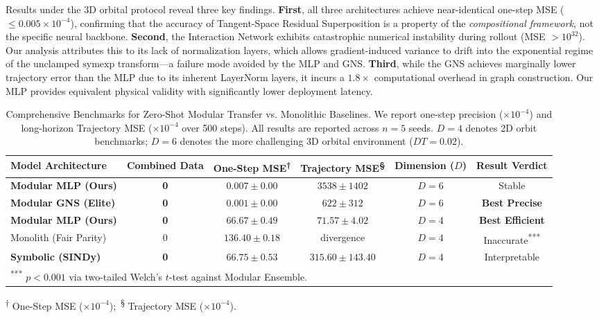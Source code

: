 \documentclass[twoside,11pt]{article}
\begin{document}
Results under the 3D orbital protocol reveal three key findings. \textbf{First}, all three architectures achieve near-identical one-step MSE ($\leq 0.005 \times 10^{-4}$), confirming that the accuracy of Tangent-Space Residual Superposition is a property of the \emph{compositional framework}, not the specific neural backbone. \textbf{Second}, the Interaction Network exhibits catastrophic numerical instability during rollout (MSE $> 10^{32}$). Our analysis attributes this to its lack of normalization layers, which allows gradient-induced variance to drift into the exponential regime of the unclamped $\text{symexp}$ transform---a failure mode avoided by the MLP and GNS. \textbf{Third}, while the GNS achieves marginally lower trajectory error than the MLP due to its inherent LayerNorm layers, it incurs a $1.8\times$ computational overhead in graph construction. Our MLP provides equivalent physical validity with significantly lower deployment latency.

\begin{table}[h]
\centering
\caption{Comprehensive Benchmarks for Zero-Shot Modular Transfer vs. Monolithic Baselines. We report one-step precision ($\times 10^{-4}$) and long-horizon Trajectory MSE ($\times 10^{-4}$ over 500 steps). All results are reported across $n=5$ seeds. $D=4$ denotes 2D orbit benchmarks; $D=6$ denotes the more challenging 3D orbital environment ($DT=0.02$).}
\label{tab:3d_results}
\small
\begin{tabular}{@{}lccccc@{}}
\toprule
Model Architecture & Combined Data & One-Step MSE\textsuperscript{†} & Trajectory MSE\textsuperscript{§} & Dimension ($D$) & Result Verdict \\
\midrule
\textbf{Modular MLP (Ours)} & \textbf{0} & \textbf{$0.007 \pm 0.00$} & $3538 \pm 1402$ & $D=6$ & Stable \\
\textbf{Modular GNS (Elite)} & \textbf{0} & \textbf{$0.001 \pm 0.00$} & \textbf{$622 \pm 312$} & $D=6$ & \textbf{Best Precise} \\
\midrule
\textbf{Modular MLP (Ours)} & \textbf{0} & $66.67 \pm 0.49$ & \textbf{$71.57 \pm 4.02$} & $D=4$ & \textbf{Best Efficient} \\
Monolith (Fair Parity) & 0 & $136.40 \pm 0.18$ & divergence & $D=4$ & Inaccurate\textsuperscript{***} \\
\midrule
\textbf{Symbolic (SINDy)} & \textbf{0} & $66.75 \pm 0.53$ & $315.60 \pm 143.40$ & $D=4$ & Interpretable \\
\midrule
\multicolumn{6}{l}{\small \textsuperscript{***} $p < 0.001$ via two-tailed Welch's $t$-test against Modular Ensemble.} \\
\bottomrule
\end{tabular}

\vspace{1mm}
{\small \raggedright \textsuperscript{†} One-Step MSE ($\times 10^{-4}$);\ \textsuperscript{§} Trajectory MSE ($\times 10^{-4}$).\par}
\end{table}
\end{document}
